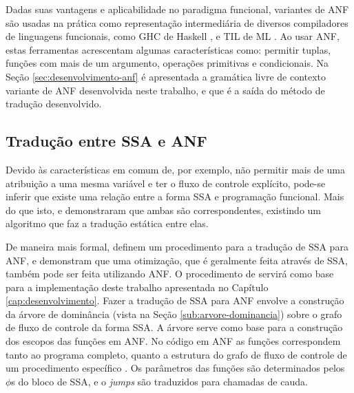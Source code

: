 Dadas suas vantagens e aplicabilidade no paradigma funcional, variantes de ANF são usadas na prática como representação intermediária de diversos compiladores de linguagens funcionais, como GHC de Haskell \cite{jones1998transformation}, e TIL de ML \cite{wegman1991constant}. Ao usar ANF, estas ferramentas acrescentam algumas características como: permitir tuplas, funções com mais de um argumento, operações primitivas e condicionais. Na Seção \ref{sec:desenvolvimento-anf} é apresentada a gramática livre de contexto variante de ANF desenvolvida neste trabalho, e que é a saída do método de tradução desenvolvido.

\subsection{Tradução entre SSA e ANF}

Devido às características em comum de, por exemplo, não permitir mais de uma atribuição a uma mesma variável e ter o fluxo de controle explícito, pode-se inferir que existe uma relação entre a forma SSA e programação funcional. Mais do que isto,  e  demonstraram que ambas são correspondentes, existindo um algoritmo que faz a tradução estática entre elas.

De maneira mais formal,  definem um procedimento para a tradução de SSA para ANF, e demonstram que uma otimização, que é geralmente feita através de SSA, também pode ser feita utilizando ANF. O procedimento de  servirá como base para a implementação deste trabalho apresentada no Capítulo \ref{cap:desenvolvimento}. Fazer a tradução de SSA para ANF envolve a construção da árvore de dominância (vista na Seção \ref{sub:arvore-dominancia}) sobre o grafo de fluxo de controle da forma SSA. A árvore serve como base para a construção dos escopos das funções em ANF. No código em ANF as funções correspondem tanto ao programa completo, quanto a estrutura do grafo de fluxo de controle de um procedimento específico \cite{ssaToAnf}. Os parâmetros das funções são determinados pelos $\phi$s do bloco de SSA, e o \emph{jumps} são traduzidos para chamadas de cauda.

